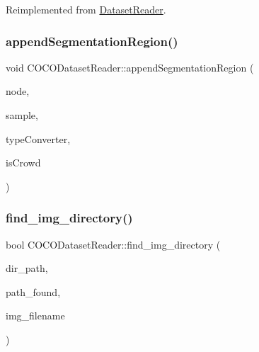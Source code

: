 Reimplemented from \hyperlink{class_dataset_reader_a732438244cec7c20294f93c6b635888c}{Dataset\+Reader}.

\mbox{\label{class_c_o_c_o_dataset_reader_a2e9d81e9fa12aa9d0e5df202f53792f0}} 
\subsubsection{\texorpdfstring{append\+Segmentation\+Region()}{appendSegmentationRegion()}}
{\footnotesize\ttfamily void C\+O\+C\+O\+Dataset\+Reader\+::append\+Segmentation\+Region (\begin{DoxyParamCaption}\item[{const rapidjson\+::\+Value \&}]{node,  }\item[{\hyperlink{struct_sample}{Sample} \&}]{sample,  }\item[{\hyperlink{struct_class_type_generic}{Class\+Type\+Generic}}]{type\+Converter,  }\item[{const bool}]{is\+Crowd }\end{DoxyParamCaption})}

\mbox{\label{class_c_o_c_o_dataset_reader_a081c7b899608f70981075a37b291a221}} 
\subsubsection{\texorpdfstring{find\+\_\+img\+\_\+directory()}{find\_img\_directory()}}
{\footnotesize\ttfamily bool C\+O\+C\+O\+Dataset\+Reader\+::find\+\_\+img\+\_\+directory (\begin{DoxyParamCaption}\item[{const boost\+::filesystem\+::path \&}]{dir\+\_\+path,  }\item[{boost\+::filesystem\+::path \&}]{path\+\_\+found,  }\item[{std\+::string \&}]{img\+\_\+filename }\end{DoxyParamCaption})}

